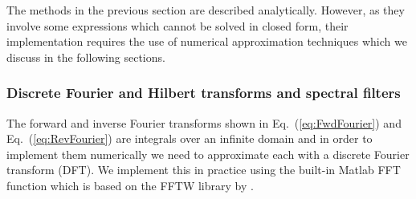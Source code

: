 \documentclass[11pt,a4paper]{article}
\begin{document}
The methods in the previous section are described analytically. However, as they involve some expressions which cannot be solved in closed form, their implementation requires the use of numerical approximation techniques which we discuss in the following sections.

\subsubsection{Discrete Fourier and Hilbert transforms and spectral filters}

The forward and inverse Fourier transforms shown in Eq.~(\ref{eq:FwdFourier}) and Eq.~(\ref{eq:RevFourier}) are integrals over an infinite domain and in order to implement them numerically we need to approximate each with a discrete Fourier transform (DFT).
We implement this in practice using the built-in Matlab FFT function which is based on the FFTW library by \cite{frigo1998fftw}.
\FloatBarrier
\end{document}
